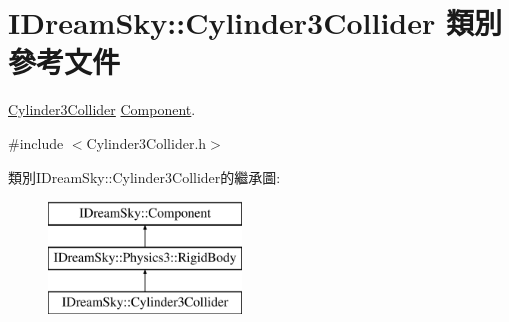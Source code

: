 \hypertarget{class_i_dream_sky_1_1_cylinder3_collider}{}\section{I\+Dream\+Sky\+:\+:Cylinder3\+Collider 類別 參考文件}
\label{class_i_dream_sky_1_1_cylinder3_collider}


\hyperlink{class_i_dream_sky_1_1_cylinder3_collider}{Cylinder3\+Collider} \hyperlink{class_i_dream_sky_1_1_component}{Component}.  




{\ttfamily \#include $<$Cylinder3\+Collider.\+h$>$}

類別\+I\+Dream\+Sky\+:\+:Cylinder3\+Collider的繼承圖\+:\begin{figure}[H]
\begin{center}
\leavevmode
\includegraphics[height=3.000000cm]{class_i_dream_sky_1_1_cylinder3_collider}
\end{center}
\end{figure}

